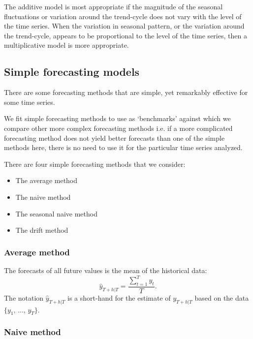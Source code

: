       \vspace{1em}

      The additive model is most appropriate if the magnitude of the seasonal fluctuations or variation around the trend-cycle does not vary with the level of the time series. When the variation in seasonal pattern, or the variation around the trend-cycle, appears to be proportional to the level of the time series, then a multiplicative model is more appropriate. 

   \subsection{Simple forecasting models}

      \cite{Watson2025} There are some forecasting methods that are simple, yet remarkably effective for some time series.

      \vspace{1em}
      
      We fit simple forecasting methods to use as `benchmarks' against which we compare other more complex forecasting methods i.e. if a more complicated forecasting method does not yield better forecasts than one of the simple methods here, there is no need to use it for the particular time series analyzed.

      \vspace{1em}

      There are four simple forecasting methods that we consider:
      \begin{itemize}
         \item The average method
         \item The naive method
         \item The seasonal naive method
         \item The drift method
      \end{itemize}

      \subsubsection{Average method}

         The forecasts of all future values is the mean of the historical data: \[\hat{y}_{T+h|T} = \frac{\sum_{t=1}^{T} y_{t}}{T}.\]
         The notation \(\hat{y}_{T+h|T}\) is a short-hand for the estimate of \(y_{T+h|T}\) based on the data \(\{y_{1},\, \ldots,\, y_{T}\}\).

      \subsubsection{Naive method}

